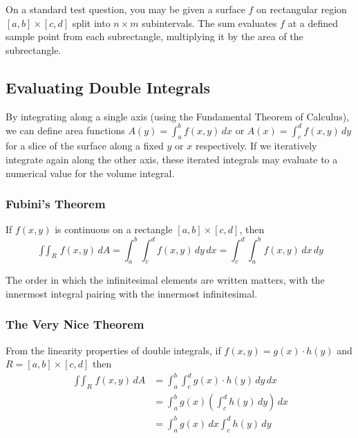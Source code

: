 \documentclass{article}
\begin{document}
On a standard test question, you may be given a surface $f$ on rectangular region $[a,b]\times[c,d]$ split into $n \times m$ subintervals. The sum evaluates $f$ at a defined sample point from each subrectangle, multiplying it by the area of the subrectangle.

\subsection{Evaluating Double Integrals}
By integrating along a single axis (using the Fundamental Theorem of Calculus), we can define area functions $A(y)=\int_a^bf(x,y)\,dx$ or $A(x)=\int_c^df(x,y)\,dy$ for a slice of the surface along a fixed $y$ or $x$ respectively. If we iteratively integrate again along the other axis, these iterated integrals may evaluate to a numerical value for the volume integral.

\subsubsection{Fubini's Theorem}
If $f(x,y)$ is continuous on a rectangle $[a,b]\times[c,d]$, then
$$\mathop{\int\int}_Rf(x,y)\,dA=\int_a^b\int_c^df(x,y)\,dy\,dx=\int_c^d\int_a^bf(x,y)\,dx\,dy$$

The order in which the infinitesimal elements are written matters, with the innermost integral pairing with the innermost infinitesimal.

\subsubsection{The Very Nice Theorem}
From the linearity properties of double integrals, if $f(x,y)=g(x) \cdot h(y)$ and $R=[a,b]\times[c,d]$ then
\begin{align*}
    \mathop{\int\int}_Rf(x,y)\,dA &=\int_a^b\int_c^dg(x)\cdot h(y)\,dy\,dx\\
        &=\int_a^bg(x)\left(\int_c^d h(y)\,dy\right)\,dx\\
    &=\int_a^bg(x)\,dx\int_c^dh(y)\,dy
\end{align*}
\end{document}
